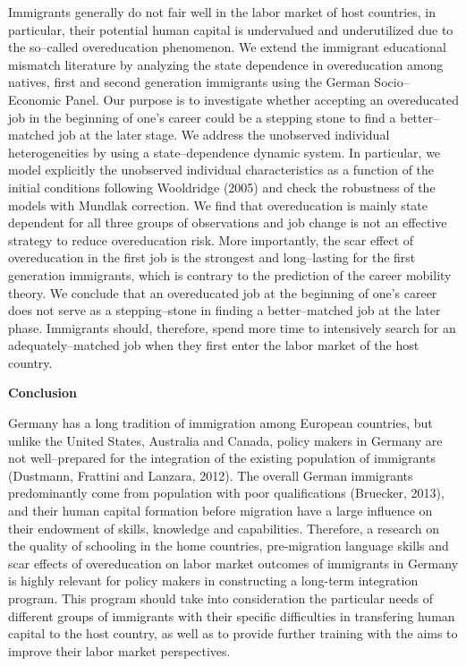 \documentclass[a4paper, 11pt]{article} %
\begin{document}
Immigrants generally do not fair well in the labor market of host countries, in particular, their potential human capital is undervalued and underutilized due to the so--called overeducation phenomenon. We extend the immigrant educational mismatch literature by analyzing the state dependence in overeducation among natives, first and second generation immigrants using the German Socio--Economic Panel. Our purpose is to investigate whether accepting an overeducated job in the beginning of one's career could be a stepping stone to find a better--matched job at the later stage. We address the unobserved individual heterogeneities by using a state--dependence dynamic system. In particular, we model explicitly the unobserved individual characteristics as a function of the initial conditions following Wooldridge (2005) and check the robustness of the models with Mundlak correction. We find that overeducation is mainly state dependent for all three groups of observations and job change is not an effective strategy to reduce overeducation risk. More importantly, the scar effect of overeducation in the first job is the strongest and long--lasting for the first generation immigrants, which is contrary to the prediction of the career mobility theory. We conclude that an overeducated job at the beginning of one's career does not serve as a stepping--stone in finding a better--matched job at the later phase. Immigrants should, therefore, spend more time to intensively search for an adequately--matched job when they first enter the labor market of the host country.

\vspace{15pt}

\textbf{Conclusion}

\vspace{15pt}

Germany has a long tradition of immigration among European countries, but unlike the United States, Australia and Canada, policy makers in Germany are not well--prepared for the integration of the existing population of immigrants (Dustmann, Frattini and Lanzara, 2012). The overall German immigrants predominantly come from population with poor qualifications (Bruecker, 2013), and their human capital formation before migration have a large influence on their endowment of skills, knowledge and capabilities. Therefore, a research on the quality of schooling in the home countries, pre-migration language skills and scar effects of overeducation on labor market outcomes of immigrants in Germany is highly relevant for policy makers in constructing a long-term integration program. This program should take into consideration the particular needs of different groups of immigrants with their specific difficulties in transfering human capital to the host country, as well as to provide further training with the aims to improve their labor market perspectives.



\end{document}
